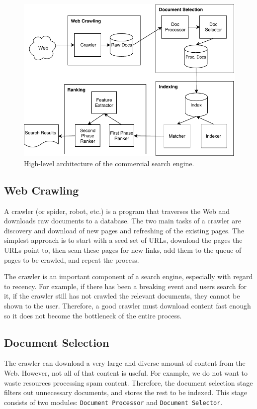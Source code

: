 \begin{figure}
  \centering
  \includegraphics[width=\linewidth]{img/webranking.pdf}
  \caption{High-level architecture of the commercial search engine.}
  \label{fig:arch}
\end{figure}

\subsection{Web Crawling}
A crawler (or spider, robot, etc.) is a program that traverses the Web and downloads raw documents to a database. The two main tasks of a crawler are discovery and download of new pages and refreshing of the existing pages. The simplest approach is to start with a seed set of URLs, download the pages the URLs point to, then scan these pages for new links, add them to the queue of pages to be crawled, and repeat the process.

The crawler is an important component of a search engine, especially with regard to recency. For example, if there has been a breaking event and users search for it, if the crawler still has not crawled the relevant documents, they cannot be shown to the user. Therefore, a good crawler must download content fast enough so it does not become the bottleneck of the entire process.

\subsection{Document Selection}
The crawler can download a very large and diverse amount of content from the Web. However, not all of that content is useful. For example, we do not want to waste resources processing spam content. Therefore, the document selection stage filters out unnecessary documents, and stores the rest to be indexed. This stage consists of two modules: \texttt{Document Processor} and \texttt{Document Selector}. 

